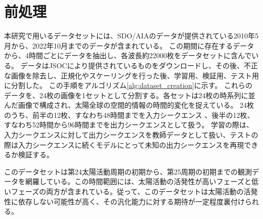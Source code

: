 \section{前処理}
本研究で用いるデータセットには、SDO/AIAのデータが提供されている2010年5月から、2022年10月までのデータが含まれている。  
この期間に存在するデータから、4時間ごとにデータを抽出し、各波長約22000枚をデータセットに含んでいる。
データはJSOCにより提供されているものをダウンロードし、その後、不正な画像を除去し、正規化やスケーリングを行った後、学習用、検証用、テスト用に分割した。
この手順をアルゴリズム\ref{alg:dataset_creation}に示す。
これらのデータを、24枚の画像を1セットとして分割する。各セットは24枚の時系列に並んだ画像で構成され、太陽全球の空間的情報の時間的変化を捉えている。
24枚のうち、前半の12枚、すなわち48時間までを入力シークエンス 、後半の12枚、すなわち52時間から96時間までを出力シークエンスとして扱う。
学習の際は、入力シークエンスに対して出力シークエンスを教師データとして扱い、テストの際は入力シークエンスに続くモデルにとって未知の出力シークエンスを再現できるか検証する。

このデータセットは第24太陽活動周期の初期から、第25周期の初期までの観測データを網羅している。この時間範囲には、太陽活動の活発性が高いフェーズと低いフェーズの両方が含まれている。従って、このデータセットは太陽活動の活発性に依存しない可能性が高く、その汎化能力に対する期待が一定程度裏付けられる。

